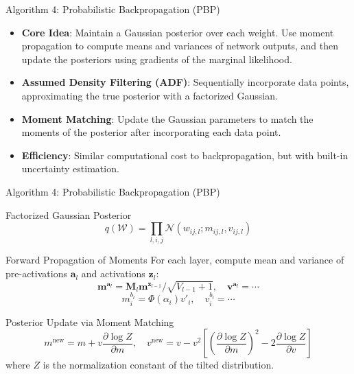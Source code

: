 \documentclass[10pt]{beamer}
\begin{document}
\begin{frame}{Algorithm 4: Probabilistic Backpropagation (PBP)}

\begin{itemize}
    \item \textbf{Core Idea}: Maintain a Gaussian posterior over each weight. Use moment propagation to compute means and variances of network outputs, and then update the posteriors using gradients of the marginal likelihood.
    \item \textbf{Assumed Density Filtering (ADF)}: Sequentially incorporate data points, approximating the true posterior with a factorized Gaussian.
    \item \textbf{Moment Matching}: Update the Gaussian parameters to match the moments of the posterior after incorporating each data point.
    \item \textbf{Efficiency}: Similar computational cost to backpropagation, but with built-in uncertainty estimation.
\end{itemize}
\end{frame}

\begin{frame}{Algorithm 4: Probabilistic Backpropagation (PBP)}

\begin{block}{Factorized Gaussian Posterior}
\[
q(\mathcal{W}) = \prod_{l,i,j} \mathcal{N}(w_{ij,l}; m_{ij,l}, v_{ij,l})
\]
\end{block}

\begin{block}{Forward Propagation of Moments}
For each layer, compute mean and variance of pre-activations $\mathbf{a}_l$ and activations $\mathbf{z}_l$:
\[
\mathbf{m}^{\mathbf{a}_l} = \mathbf{M}_l \mathbf{m}^{\mathbf{z}_{l-1}} / \sqrt{V_{l-1}+1}, \quad
\mathbf{v}^{\mathbf{a}_l} = \cdots
\]
\[
m_i^{b_l} = \Phi(\alpha_i) v'_i, \quad v_i^{b_l} = \cdots
\]
\end{block}

\begin{block}{Posterior Update via Moment Matching}
\[
m^{\text{new}} = m + v \frac{\partial \log Z}{\partial m}, \quad
v^{\text{new}} = v - v^2 \left[ \left( \frac{\partial \log Z}{\partial m} \right)^2 - 2 \frac{\partial \log Z}{\partial v} \right]
\]
where $Z$ is the normalization constant of the tilted distribution.
\end{block}
\end{frame}
\end{document}

